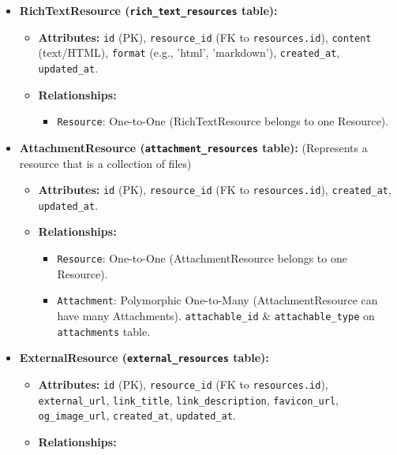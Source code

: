 \documentclass[12pt,a4paper]{article}
\begin{document}
\begin{itemize}
\begin{itemize}
\begin{itemize}
        \end{itemize}
    \end{itemize}
    \item \textbf{RichTextResource (\texttt{rich\_text\_resources} table):}
    \begin{itemize}
        \item \textbf{Attributes:} \texttt{id} (PK), \texttt{resource\_id} (FK to \texttt{resources.id}), \texttt{content} (text/HTML), \texttt{format} (e.g., 'html', 'markdown'), \texttt{created\_at}, \texttt{updated\_at}.
        \item \textbf{Relationships:}
        \begin{itemize}
            \item \texttt{Resource}: One-to-One (RichTextResource belongs to one Resource).
        \end{itemize}
    \end{itemize}
    \item \textbf{AttachmentResource (\texttt{attachment\_resources} table):} (Represents a resource that is a collection of files)
    \begin{itemize}
        \item \textbf{Attributes:} \texttt{id} (PK), \texttt{resource\_id} (FK to \texttt{resources.id}), \texttt{created\_at}, \texttt{updated\_at}.
        \item \textbf{Relationships:}
        \begin{itemize}
            \item \texttt{Resource}: One-to-One (AttachmentResource belongs to one Resource).
            \item \texttt{Attachment}: Polymorphic One-to-Many (AttachmentResource can have many Attachments). \texttt{attachable\_id} \& \texttt{attachable\_type} on \texttt{attachments} table.
        \end{itemize}
    \end{itemize}
    \item \textbf{ExternalResource (\texttt{external\_resources} table):}
    \begin{itemize}
        \item \textbf{Attributes:} \texttt{id} (PK), \texttt{resource\_id} (FK to \texttt{resources.id}), \texttt{external\_url}, \texttt{link\_title}, \texttt{link\_description}, \texttt{favicon\_url}, \texttt{og\_image\_url}, \texttt{created\_at}, \texttt{updated\_at}.
        \item \textbf{Relationships:}
        \begin{itemize}

\end{itemize}
\end{itemize}
\end{itemize}
\end{document}
